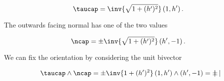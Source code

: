 \begin{equation}\label{eqn:inclinedFlowWithoutConstantHeightAssumption:n}
\taucap = \inv{\sqrt{1 + (h')^2}} \left( 1, h' \right).
\end{equation}

The outwards facing normal has one of the two values

\begin{equation}\label{eqn:inclinedFlowWithoutConstantHeightAssumption:n}
\ncap = 
\pm \inv{\sqrt{1 + (h')^2}} \left( h', -1 \right).
\end{equation}

We can fix the orientation by considering the unit bivector

\begin{align*}
\taucap \wedge \ncap = 
\pm \inv{1 + (h')^2} 
\left( 1, h' \right) 
\wedge
\left( h', -1 \right) 
=
\pm 
\begin{vmatrix}
\end{vmatrix}
\end{align*}

\EndNoBibArticle
